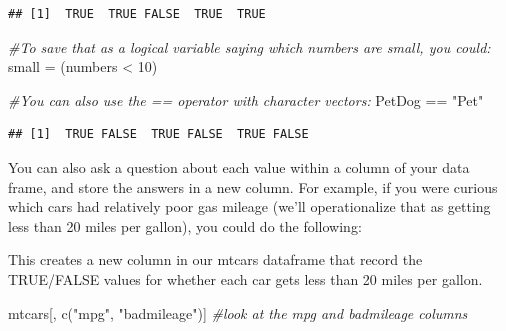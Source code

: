 \documentclass[
]{book}
\newenvironment{Shaded}{\begin{snugshade}}{\end{snugshade}}
\newcommand{\CommentTok}[1]{\textcolor[rgb]{0.56,0.35,0.01}{\textit{#1}}}
\newcommand{\DecValTok}[1]{\textcolor[rgb]{0.00,0.00,0.81}{#1}}
\newcommand{\FunctionTok}[1]{\textcolor[rgb]{0.00,0.00,0.00}{#1}}
\newcommand{\NormalTok}[1]{#1}
\newcommand{\OtherTok}[1]{\textcolor[rgb]{0.56,0.35,0.01}{#1}}
\newcommand{\SpecialCharTok}[1]{\textcolor[rgb]{0.00,0.00,0.00}{#1}}
\newcommand{\StringTok}[1]{\textcolor[rgb]{0.31,0.60,0.02}{#1}}
\begin{document}
\begin{verbatim}
## [1]  TRUE  TRUE FALSE  TRUE  TRUE
\end{verbatim}

\begin{Shaded}
\begin{Highlighting}[]
\CommentTok{\#To save that as a logical variable saying which numbers are small, you could:}
\NormalTok{small }\OtherTok{=}\NormalTok{ (numbers }\SpecialCharTok{\textless{}} \DecValTok{10}\NormalTok{) }

\CommentTok{\#You can also use the == operator with character vectors:}
\NormalTok{PetDog }\SpecialCharTok{==} \StringTok{"Pet"}
\end{Highlighting}
\end{Shaded}

\begin{verbatim}
## [1]  TRUE FALSE  TRUE FALSE  TRUE FALSE
\end{verbatim}

You can also ask a question about each value within a column of your data frame, and store the answers in a new column. For example, if you were curious which cars had relatively poor gas mileage (we'll operationalize that as getting less than 20 miles per gallon), you could do the following:

\begin{Shaded}
\end{Shaded}

This creates a new column in our mtcars dataframe that record the TRUE/FALSE values for whether each car gets less than 20 miles per gallon.

\begin{Shaded}
\begin{Highlighting}[]
\NormalTok{mtcars[, }\FunctionTok{c}\NormalTok{(}\StringTok{"mpg"}\NormalTok{, }\StringTok{"badmileage"}\NormalTok{)] }\CommentTok{\#look at the mpg and badmileage columns}
\end{Highlighting}
\end{Shaded}
\end{document}
